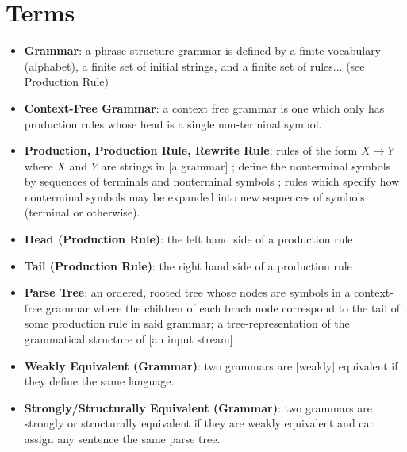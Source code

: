 \documentclass[11pt]{article}
\begin{document}
\clearpage

\section*{Terms}

\begin{itemize}
\item \textbf{Grammar}: a phrase-structure grammar is defined by a finite vocabulary (alphabet), a finite set of
initial strings, and a finite set of rules... \cite{chomsky} (see Production Rule)
\item \textbf{Context-Free Grammar}: a context free grammar is one which only has production rules whose head is a single non-terminal symbol.
\cite{compiler, anatomy, formal_langs}
\item \textbf{Production, Production Rule, Rewrite Rule}: rules of the form $X \rightarrow Y$ where
$X$ and $Y$ are strings in [a grammar]  \cite{chomsky};
define the nonterminal symbols by sequences of terminals and nonterminal symbols \cite{compiler};
rules which specify how nonterminal symbols may be expanded into new sequences of symbols (terminal or otherwise).
\item \textbf{Head (Production Rule)}: the left hand side of a production rule
\item \textbf{Tail (Production Rule)}: the right hand side of a production rule
\item \textbf{Parse Tree}: an ordered, rooted tree whose nodes are symbols in a context-free grammar where the 
children of each brach node correspond to the tail of some production rule in said grammar;
a tree-representation of the grammatical structure of [an input stream] \cite{anatomy}
\item \textbf{Weakly Equivalent (Grammar)}: two grammars are [weakly] equivalent if they define the same language.\cite{reghizzi}
\item \textbf{Strongly/Structurally Equivalent (Grammar)}: two grammars are strongly or structurally equivalent
if they are weakly equivalent and can assign any sentence the same parse tree. \cite{reghizzi}
\end{itemize}


{}

\end{document}
